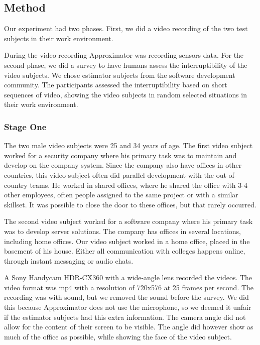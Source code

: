 \documentclass{sigchi}
\begin{document}
\subsection{Method}
\label{method}
Our experiment had two phases.
First, we did a video recording of the two test subjects in their work environment.

During the video recording Approximator was recording sensors data.
For the second phase, we did a survey to have humans assess the interruptibility of the video subjects.
We chose estimator subjects from the software development community.
The participants assessed the interruptibility based on short sequences of video, showing the video subjects in random selected situations in their work environment.

\subsubsection{Stage One}
The two male video subjects were 25 and 34 years of age.
The first video subject worked for a security company where his primary task was to maintain and develop on the company system.
Since the company also have offices in other countries, this video subject often did parallel development with the out-of-country teams.
He worked in shared offices, where he shared the office with 3-4 other employees, often people assigned to the same project or with a similar skillset.
It was possible to close the door to these offices, but that rarely occurred.

The second video subject worked for a software company where his primary task was to develop server solutions.
The company has offices in several locations, including home offices.
Our video subject worked in a home office, placed in the basement of his house.
Either all communication with colleges happens online, through instant messaging or audio chats.

A Sony Handycam HDR-CX360 with a wide-angle lens recorded the videos.
The video format was mp4 with a resolution of 720x576 at 25 frames per second.
The recording was with sound, but we removed the sound before the survey.
We did this because Approximator does not use the microphone, so we deemed it unfair if the estimator subjects had this extra information.
The camera angle did not allow for the content of their screen to be visible.
The angle did however show as much of the office as possible, while showing the face of the video subject.
\end{document}
